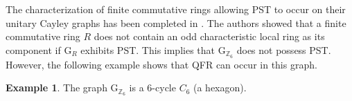 \documentclass[12pt]{amsart}
\numberwithin{equation}{section}
\theoremstyle{definition}
\newtheorem{ex}[thm]{Example}
\theoremstyle{definition} \numberwithin{equation}{section}
\newcommand{\G}{\mathrm{G}}
\begin{document}
The characterization of finite commutative rings allowing PST to occur on their unitary Cayley graphs has been completed in \cite[Theorem 2.5]{TI}. The authors showed that a finite commutative ring $R$ does not contain an odd characteristic local ring as its component if $\G_R$ exhibits PST. This implies that $\G_{\mathbb{Z}_6}$ does not possess PST. However, the following example shows that QFR can occur in this graph.

\begin{ex}
The graph $\G_{\mathbb{Z}_6}$ is a $6$-cycle $C_6$ (a hexagon).

    \vspace{0.5 cm}
    \begin{center}
\end{center}
\end{ex}
\end{document}
